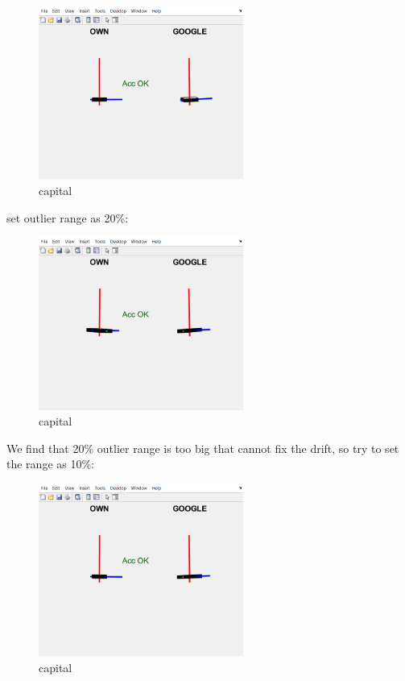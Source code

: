 \begin{figure}[H]
 \centering
 \includegraphics[width=0.6\textwidth]{images/beginwithoutlier.png}
 \caption{capital}
 \label{label}
\end{figure}

set outlier range as 20\%:

\begin{figure}[H]
 \centering
 \includegraphics[width=0.6\textwidth]{images/20range.png}
 \caption{capital}
 \label{label}
\end{figure}

We find that 20\% outlier range is too big that cannot fix the drift, so try to set the range as 10\%:

\begin{figure}[H]
 \centering
 \includegraphics[width=0.6\textwidth]{images/new10begin.png}
 \caption{capital}
 \label{label}
\end{figure}

